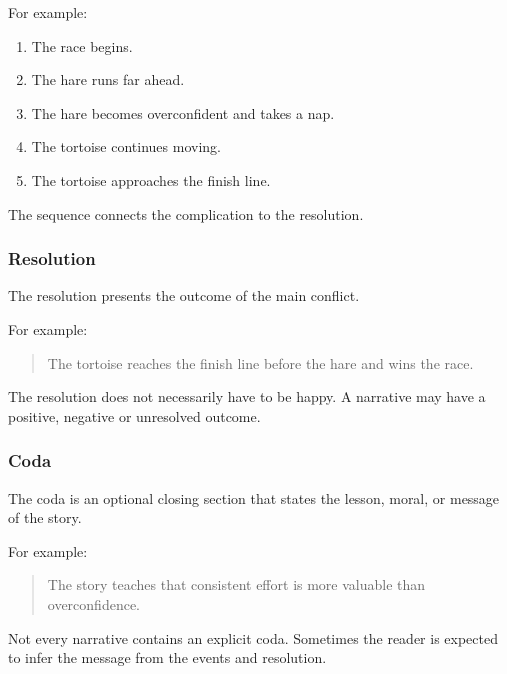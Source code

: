 For example:

\begin{enumerate}
\item The race begins.
\item The hare runs far ahead.
\item The hare becomes overconfident and takes a nap.
\item The tortoise continues moving.
\item The tortoise approaches the finish line.
\end{enumerate}

The sequence connects the complication to the resolution.

\subsubsection{Resolution}

The resolution presents the outcome of the main conflict.


For example:

\begin{quotation}
  The tortoise reaches the finish line before the hare and wins the race.
\end{quotation}

The resolution does not necessarily have to be happy. A narrative may have a positive, negative or unresolved outcome.

\subsubsection{Coda}

The coda is an optional closing section that states the lesson, moral, or message of the story.


For example:

\begin{quotation}
  The story teaches that consistent effort is more valuable than overconfidence.
\end{quotation}

Not every narrative contains an explicit coda. Sometimes the reader is expected to infer the message from the events and resolution.
